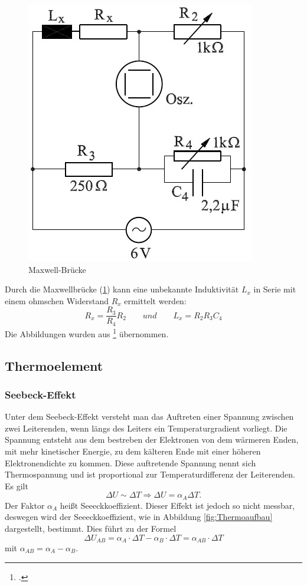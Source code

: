 \begin{figure}[H]
  \centering
  \includegraphics[width=.5\textwidth]{maxwell.jpg}
  \caption{Maxwell-Brücke}
  \label{fig:maxwell}
\end{figure}
Durch die Maxwellbrücke (\cref{fig:maxwell}) kann eine unbekannte Induktivität $L_x$ in Serie mit einem ohmschen Widerstand $R_x$ ermittelt werden:
\begin{equation}
  R_x=\frac{R_3}{R_4}R_2 \qquad und \qquad L_x=R_2 R_3 C_4
  \label{eq:maxwell}
\end{equation}
Die Abbildungen wurden aus \footcite{anleitung-ws2014} übernommen.
\subsection{Thermoelement}
\subsubsection{Seebeck-Effekt}
Unter dem Seebeck-Effekt versteht man das Auftreten einer Spannung zwischen zwei Leiterenden, wenn  längs des Leiters ein Temperaturgradient vorliegt. Die Spannung entsteht aus dem bestreben der Elektronen von dem wärmeren Enden, mit mehr kinetischer Energie, zu dem kälteren Ende mit einer höheren Elektronendichte zu kommen. Diese auftretende Spannung nennt sich Thermospannung und ist proportional zur Temperaturdifferenz der Leiterenden. Es gilt
\begin{equation}
\Delta U \sim \Delta T \Rightarrow \Delta U= \alpha_A\Delta T.
\end{equation} 
Der Faktor $\alpha_A$ heißt Seeeckkoeffizient. Dieser Effekt ist jedoch so nicht messbar, deswegen wird der Seeeckkoeffizient, wie in Abbildung \ref{fig:Thermoaufbau} dargestellt, bestimmt. Dies führt zu der Formel
\begin{equation}
\Delta U_{AB}=\alpha_A\cdot \Delta T -\alpha_B\cdot \Delta T = \alpha_{AB}\cdot \Delta T
\label{eq:Thermo}
\end{equation}
mit $\alpha_{AB}=\alpha_A-\alpha_B$.
